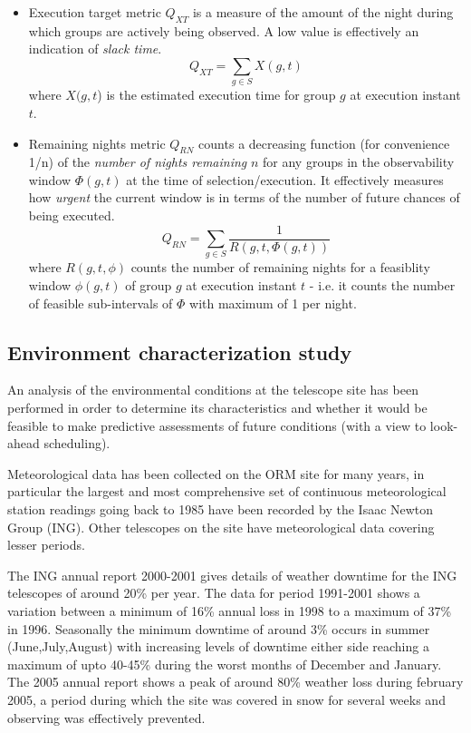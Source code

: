 \documentclass[12pt,a4paper]{article}
\begin{document}
\begin{description}
\begin{itemize}
\item Execution target metric $Q_{XT}$ is a measure of the amount of the night during which groups are actively being observed. A low value is effectively an indication of \emph{slack time}.
\begin{equation}
Q_{XT} = \sum_{g \in S}{X(g,t)}
\end{equation}
where $X(g,t$) is the estimated execution time for group $g$ at execution instant $t$.

\item Remaining nights metric $Q_{RN}$ counts a decreasing function (for convenience 1/n) of the \emph{number of nights remaining} $n$ for any groups in the observability window $\Phi(g,t)$ at the time of selection/execution. It effectively measures how \emph{urgent} the current window is in terms of the number of future chances of being executed.
\begin{equation}
Q_{RN} = \sum_{g \in S}{\frac{1}{R(g,t,\Phi(g,t))}}
\end{equation}
where $R(g,t,\phi)$ counts the number of remaining nights for a feasiblity window $\phi(g,t)$ of group $g$ at execution instant $t$ - i.e. it counts the number of feasible sub-intervals of $\Phi$ with maximum of 1 per night.

\end{itemize}

\end{description}

\subsection{Environment characterization study}
\label{subsect:ecs}
An analysis of the environmental conditions at the telescope site has been performed in order to determine its characteristics and whether it would be feasible to make predictive assessments of future conditions (with a view to look-ahead scheduling).

Meteorological data has been collected on the ORM site for many years, in particular the largest and most comprehensive set of continuous meteorological station readings going back to 1985 have been recorded by the Isaac Newton Group (ING). Other telescopes on the site have meteorological data covering lesser periods. 

The ING annual report 2000-2001 \citep{ing00annual} gives details of weather downtime for the ING telescopes of around 20\% per year. The data for period 1991-2001 shows a variation between a minimum of 16\% annual loss in 1998 to a maximum of 37\% in 1996. Seasonally the minimum downtime of around 3\% occurs in summer (June,July,August) with increasing levels of downtime either side reaching a maximum of upto 40-45\% during the worst months of December and January. The 2005 annual report shows a peak of around 80\% weather loss during february 2005, a period during which the site was covered in snow for several weeks and observing was effectively prevented.
\end{document}

